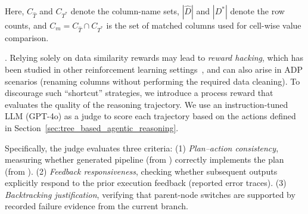 Here, $C_{\hat{T}}$ and $C_{T^\ast}$ denote the column-name sets, $|\hat{D}|$ and $|D^\ast|$ denote the row counts, and $C_{m} = C_{\hat{T}} \cap C_{T^*}$ is the set of matched columns used for cell-wise value comparison.
%

.
Relying solely on data similarity rewards may lead to \emph{reward hacking}, which has been studied in other reinforcement learning settings~\cite{taylor2025school,zhang2025reward}, and can also arise in ADP scenarios (\eg renaming columns without performing the required data cleaning).
To discourage such ``shortcut'' strategies,
we introduce a process reward that evaluates the quality of the reasoning trajectory. We use an instruction-tuned LLM (\eg GPT-4o) as a judge to score each trajectory based on the actions defined in Section~\ref{sec:tree_based_agentic_reasoning}. 

Specifically, the judge evaluates three criteria:
(1) \textit{Plan–action consistency}, measuring whether generated pipeline (from ) correctly implements the plan (from ).
(2) \textit{Feedback responsiveness}, checking whether subsequent  outputs explicitly respond to the prior execution feedback (\eg reported error traces).
(3) \textit{Backtracking justification}, verifying that parent-node switches are supported by recorded failure evidence from the current branch.



